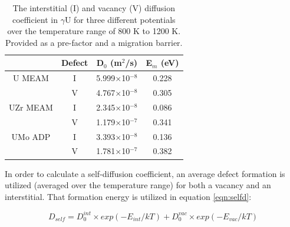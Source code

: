 \documentclass[review]{elsarticle}
\begin{document}
\begin{table}[h]
\caption{The interstitial (I) and vacancy (V) diffusion coefficient in $\gamma$U for three different potentials over the temperature range of 800 K to 1200 K. Provided as a pre-factor and a migration barrier.} \label{tab:diff}
\begin{center}
\begin{tabular}{|c|c|c|c|}
	\hline
	& Defect & D$_{0}$ (m$^{2}$/s) & E$_{m}$ (eV)\\
	 \hline
	U MEAM & I & 5.999$\times$10$^{-8}$ & 0.228 \\
			& V & 4.767$\times$10$^{-8}$ & 0.305 \\
			\hline
	UZr MEAM & I & 2.345$\times$10$^{-8}$ & 0.086 \\
			& V & 1.179$\times$10$^{-7}$ & 0.341 \\
			\hline
	UMo ADP & I & 3.393$\times$10$^{-8}$ & 0.136 \\
			& V & 1.781$\times$10$^{-7}$ & 0.382 \\
	\hline
\end{tabular}
\end{center}
\label{default}
\end{table}

In order to calculate a self-diffusion coefficient, an average defect formation is utilized (averaged over the temperature range) for both a vacancy and an interstitial. That formation energy is utilized in equation \ref{eqn:selfd}:

\begin{equation}
\label{eqn:selfd}
D_{self} = D^{int}_{0} \times exp(-E_{int}/kT) + D^{vac}_{0} \times exp(-E_{vac}/kT)
\end{equation} 
\end{document}
